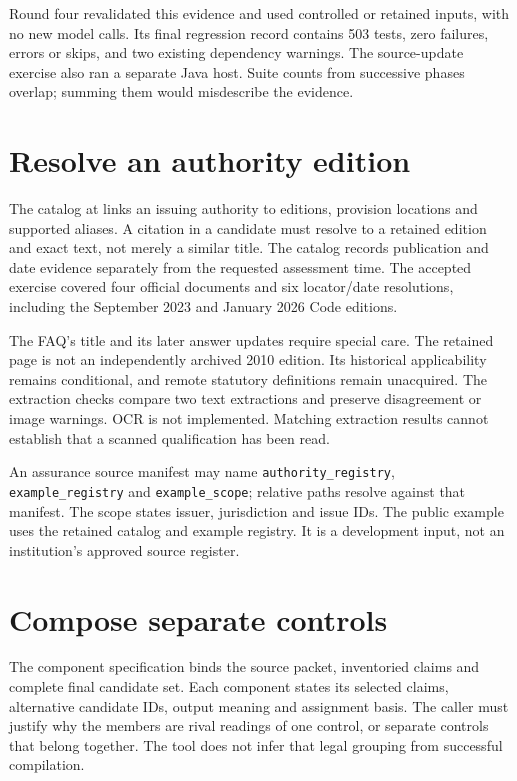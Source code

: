 Round four revalidated this evidence and used controlled or retained inputs,
with no new model calls. Its final regression record contains 503 tests, zero
failures, errors or skips, and two existing dependency warnings. The source-update
exercise also ran a separate Java host. Suite counts from successive phases
overlap; summing them would misdescribe the evidence.

\section{Resolve an authority edition}

The catalog at  links an
issuing authority to editions, provision locations and supported aliases. A
citation in a candidate must resolve to a retained edition and exact text, not
merely a similar title. The catalog records publication and date evidence
separately from the requested assessment time. The accepted exercise covered
four official documents and six locator/date resolutions, including the
September 2023 and January 2026 Code editions.

The FAQ's title and its later answer updates require special care. The retained
page is not an independently archived 2010 edition. Its historical applicability
remains conditional, and remote statutory definitions remain unacquired.
The extraction checks compare two text extractions and preserve disagreement
or image warnings. OCR is not implemented. Matching extraction results cannot
establish that a scanned qualification has been read.

An assurance source manifest may name \texttt{authority\_registry},
\texttt{example\_registry} and \texttt{example\_scope}; relative paths resolve
against that manifest. The scope states issuer, jurisdiction and issue IDs.
The public example
uses the retained catalog and example registry. It is a development input,
not an institution's approved source register.

\section{Compose separate controls}

The component specification binds the source packet, inventoried claims and
complete final candidate set. Each component states its selected claims,
alternative candidate IDs, output meaning and assignment basis. The caller
must justify why the members are rival readings of one control, or separate
controls that belong together. The tool does not infer that legal grouping
from successful compilation.

